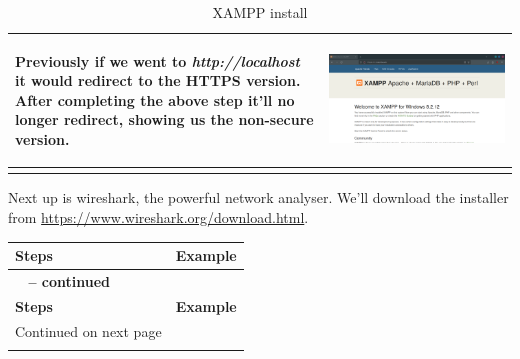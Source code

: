 \documentclass[11pt,a4paper]{report}
\begin{document}
\begin{flushleft}
\begin{center}
\begin{longtable}{ m{5cm} l }
                        \begin{flushleft}
                            Previously if we went to \textit{http://localhost} it would redirect to the HTTPS version. After completing the above step it'll no longer redirect, showing us the non-secure version.
                        \end{flushleft}
                        & \includegraphics[scale=0.285,valign=c]{install_xampp17} \\
                        \hline

                        \caption{XAMPP install} \label{tab:xampp}
                    \end{longtable}
                \end{center}

            Next up is wireshark, the powerful network analyser. We'll download the installer from \href{https://www.wireshark.org/download.html}{https://www.wireshark.org/download.html}.
                \begin{center}
                    \begin{longtable}{ m{5cm} l }
                        \textbf{Steps} & \textbf{Example} \\
                        \hline
                        \endfirsthead
                        {{\bfseries \tablename\ \thetable{} -- continued}} \\
                        \textbf{Steps} & \textbf{Example} \\
                        \hline
                        \endhead
                        \hline Continued on next page \\
                        \endfoot
                        \endlastfoot


\end{longtable}
\end{center}
\end{flushleft}
\end{document}
